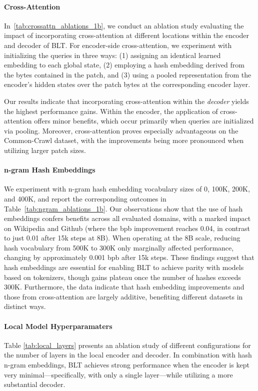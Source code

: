 \paragraph{Cross-Attention} 
In~\autoref{tab:crossattn_ablations_1b}, we conduct an ablation study evaluating the impact of incorporating cross-attention at different locations within the encoder and decoder of {\textsc BLT}. For encoder-side cross-attention, we experiment with initializing the queries in three ways: (1) assigning an identical learned embedding to each global state, (2) employing a hash embedding derived from the bytes contained in the patch, and (3) using a pooled representation from the encoder’s hidden states over the patch bytes at the corresponding encoder layer.

Our results indicate that incorporating cross-attention within the \textit{decoder} yields the highest performance gains. Within the encoder, the application of cross-attention offers minor benefits, which occur primarily when queries are initialized via pooling. Moreover, cross-attention proves especially advantageous on the Common-Crawl dataset, with the improvements being more pronounced when utilizing larger patch sizes.

\paragraph{n-gram Hash Embeddings} 

We experiment with n-gram hash embedding vocabulary sizes of 0, 100K, 200K, and 400K, and report the corresponding outcomes in Table~\ref{tab:ngram_ablations_1b}. Our observations show that the use of hash embeddings confers benefits across all evaluated domains, with a marked impact on Wikipedia and Github (where the bpb improvement reaches 0.04, in contrast to just 0.01 after 15k steps at 8B). When operating at the 8B scale, reducing hash vocabulary from 500K to 300K only marginally affected performance, changing by approximately 0.001 bpb after 15k steps. These findings suggest that hash embeddings are essential for enabling {\textsc BLT} to achieve parity with models based on tokenizers, though gains plateau once the number of hashes exceeds 300K. Furthermore, the data indicate that hash embedding improvements and those from cross-attention are largely additive, benefiting different datasets in distinct ways.

\paragraph{Local Model Hyperparamaters} Table \ref{tab:local_layers} presents an ablation study of different configurations for the number of layers in the local encoder and decoder. In combination with hash n-gram embeddings, {\textsc BLT} achieves strong performance when the encoder is kept very minimal—specifically, with only a single layer—while utilizing a more substantial decoder.

